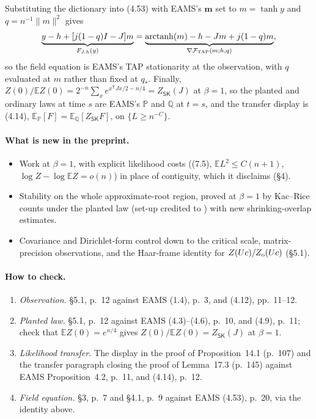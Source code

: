 \documentclass[11pt]{article}
\newcommand{\E}{\mathbb{E}}
\renewcommand{\P}{\mathbb{P}}
\newcommand{\norm}[1]{\lVert #1\rVert}
\newcommand{\ploc}[2]{#1}
\begin{document}
\noindent Substituting the dictionary into (4.53) with EAMS's $\boldsymbol m$
set to $m=\tanh y$ and $q=n^{-1}\norm m^2$ gives
\[
 \underbrace{y-h+[j(1-q)I-J]m}_{F_{J,h}(y)}
 =\underbrace{\operatorname{arctanh}(m)-h-Jm+j(1-q)m}_{\nabla\mathcal F_{\rm TAP}(m;h,q)},
\]
so the field equation is EAMS's TAP stationarity at the observation, with $q$
evaluated at $m$ rather than fixed at $q_*$. Finally,
$Z(0)/\E Z(0)=2^{-n}\sum_xe^{x^{\mathsf T}Jx/2-n/4}=Z_{\mathsf{SK}}(J)$ at
$\beta=1$, so the planted and ordinary laws at time $s$ are EAMS's $\P$ and
$\mathbb Q$ at $t=s$, and the transfer display is (4.14),
$\E_{\P}[F]=\E_{\mathbb Q}[Z_{\mathsf{SK}}F]$, on $\{L\ge n^{-C}\}$.

\paragraph{What is new in the preprint.}
\begin{itemize}
\item Work at $\beta=1$, with explicit likelihood costs ((7.5),
$\E L^2\le C(n+1)$, $\log Z-\log\E Z=o(n)$) in place of contiguity, which it
disclaims \ploc{(\S4)}{proof-overview.tex:18--20}.
\item Stability on the whole approximate-root region, proved at $\beta=1$ by
Kac--Rice counts under the planted law (set-up credited to
\cite{FanMeiMontanari2018-TAPFreeEnergyVariationalInference,CelentanoFanMei2021-LocalConvexityTAPZ2Sync})
with new shrinking-overlap estimates.
\item Covariance and Dirichlet-form control down to the critical scale,
matrix-precision observations, and the Haar-frame identity for
$Z(Uc)/Z_{\rm o}(Uc)$ \ploc{(\S5.1)}{profile-spectral.tex:54--65}.
\end{itemize}

\paragraph{How to check.}
\begin{enumerate}
\item \emph{Observation.} \ploc{\S5.1, p.~12}{profile-spectral.tex:15--38}
against EAMS (1.4), p.~3, and (4.12), pp.~11--12.
\item \emph{Planted law.} \ploc{\S5.1, p.~12}{profile-spectral.tex:40--48}
against EAMS (4.3)--(4.6), p.~10, and (4.9), p.~11; check that
$\E Z(0)=e^{n/4}$ gives $Z(0)/\E Z(0)=Z_{\mathsf{SK}}(J)$ at $\beta=1$.
\item \emph{Likelihood transfer.} The display in
\ploc{the proof of Proposition~14.1 (p.~107)}{profile-entropy.tex:240--248} and
\ploc{the transfer paragraph closing the proof of Lemma~17.3 (p.~145)}{cap-classical.tex:444--449}
against EAMS Proposition~4.2, p.~11, and (4.14), p.~12.
\item \emph{Field equation.} \ploc{\S3, p.~7}{accepted-inputs.tex:20} and
\ploc{\S4.1, p.~9}{proof-overview.tex:47--50} against EAMS (4.53), p.~20, via
the identity above.
\end{enumerate}
\end{document}
